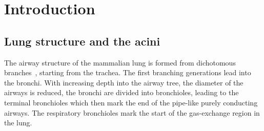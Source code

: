 \documentclass[a4paper,DIVcalc,abstract,english]{scrartcl}
\newcommand{\meantotalnumberofacinirounded}{6400}
\newcommand{\meanacinarvolume}{1.148e-03} %
\newcommand{\meannumberofalveoli}{8470} %
\newcommand{\meanacinarsurface}{0.739} %
\newcommand{\meanairspacesurface}{4340} %
\begin{document}
\begin{abstract}
The difficulty of characterizing individual respiratory functional units of the lung---the so-called acini---from two-dimensional physical sections leads to a limited knowledge about biological parameters like volume and surface.
By using high-resolution tomographic microscopic imaging we extracted single acini from rat lung samples and estimated their individual volume, surface area and number of alveoli.
Acini were isolated from the distal-medial area of the right lower rat lung lobe by semiautomatically closing the transitory bronchioles at the transition from conducting to gas-exchanging airways.
The mean acinar volume was estimated to be \SI{\meanacinarvolume}{\centi\meter\cubed} and their mean surface area to be \SI{\meanacinarsurface}{\centi\meter\squared}.
Assuming that the acini are similarly sized throughout the different regions in the lung, we calculated that one rat lung contains approximately \meantotalnumberofacinirounded\xspace acini, each containing a mean of \meannumberofalveoli alveoli and an alveolar surface area of \SI{\meanairspacesurface}{\centi\metre\squared}.
Our proposed method of analyzing single ventilatory units of the mammalian lung is by magnitudes faster than manual stereological analysis of tissue slices and allows to extract biological parameters which cannot be extracted from classic single sections.
Additionally, the method makes it possible to assess the development of the acini and structural changes in the functional lung units over the postnatal lung development.
\end{abstract}
\clearpage

\section{Introduction}
\subsection{Lung structure and the acini}
The airway structure of the mammalian lung is formed from dichotomous branches~\cite{Weibel1991}, starting from the trachea.
The first branching generations lead into the bronchi.
With increasing depth into the airway tree, the diameter of the airways is reduced, the bronchi are divided into bronchioles, leading to the terminal bronchioles which then mark the end of the pipe-like purely conducting airways.
The respiratory bronchioles mark the start of the gas-exchange region in the lung.
\end{document}
